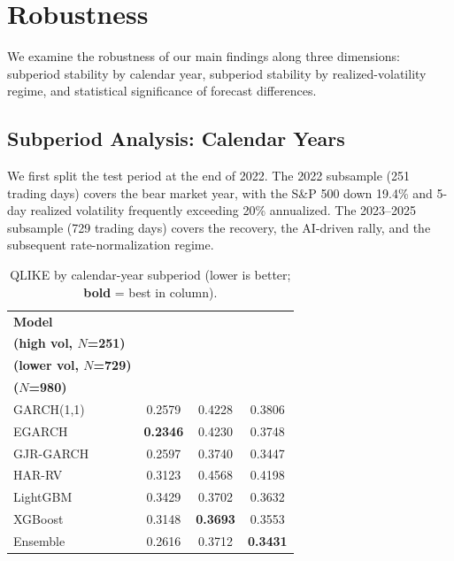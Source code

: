 \section{Robustness}\label{sec:robustness}

We examine the robustness of our main findings along three dimensions: subperiod stability by calendar year, subperiod stability by realized-volatility regime, and statistical significance of forecast differences.

\subsection{Subperiod Analysis: Calendar Years}

We first split the test period at the end of 2022. The 2022 subsample (251 trading days) covers the bear market year, with the S\&P 500 down 19.4\% and 5-day realized volatility frequently exceeding 20\% annualized. The 2023--2025 subsample (729 trading days) covers the recovery, the AI-driven rally, and the subsequent rate-normalization regime.

\begin{table}[H]
\centering
\small
\setlength{\tabcolsep}{6pt}
\caption{QLIKE by calendar-year subperiod (lower is better; \textbf{bold} = best in column).}
\label{tab:subperiod_year}
\begin{tabular}{l c c c}
\toprule
\textbf{Model} & \shortstack{\textbf{2022}\\\textbf{(high vol, $N$=251)}} & \shortstack{\textbf{2023--2025}\\\textbf{(lower vol, $N$=729)}} & \shortstack{\textbf{Full sample}\\\textbf{($N$=980)}} \\
\midrule
GARCH(1,1)   & 0.2579          & 0.4228          & 0.3806 \\
EGARCH       & \textbf{0.2346} & 0.4230          & 0.3748 \\
GJR-GARCH    & 0.2597          & 0.3740          & 0.3447 \\
HAR-RV       & 0.3123          & 0.4568          & 0.4198 \\
LightGBM     & 0.3429          & 0.3702          & 0.3632 \\
XGBoost      & 0.3148          & \textbf{0.3693} & 0.3553 \\
Ensemble     & 0.2616          & 0.3712          & \textbf{0.3431} \\
\bottomrule
\end{tabular}
\end{table}

